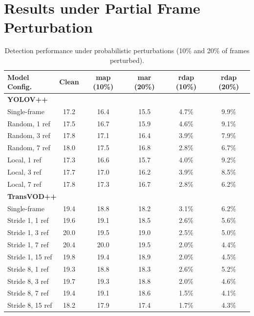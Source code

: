 \documentclass[final,twoside]{vutinfth}
\begin{document}
\section{Results under Partial Frame Perturbation}
\begingroup
\small
\begin{table}[H]
\centering
\caption{Detection performance under probabilistic perturbations (10\% and 20\% of frames perturbed).}

\small
\setlength{\tabcolsep}{3pt}

\begin{tabular}{p{} c c c c c}
\toprule
\rowcolor{tableheader}
\textbf{Model Config.} & \textbf{Clean} & \textbf{\gls{map} (10\%)} & \textbf{\gls{mar} (20\%)} & \textbf{\gls{rdap} (10\%)} & \textbf{\gls{rdap} (20\%)} \\
\midrule
\multicolumn{6}{l}{\textbf{YOLOV++}} \\
Single-frame & 17.2 & 16.4 & 15.5 & 4.7\% & 9.9\% \\
Random, 1 ref & 17.5 & 16.7 & 15.9 & 4.6\% & 9.1\% \\
Random, 3 ref & 17.8 & 17.1 & 16.4 & 3.9\% & 7.9\% \\
Random, 7 ref & 18.0 & 17.5 & 16.8 & 2.8\% & 6.7\% \\
Local, 1 ref & 17.3 & 16.6 & 15.7 & 4.0\% & 9.2\% \\
Local, 3 ref & 17.7 & 17.0 & 16.2 & 3.9\% & 8.5\% \\
Local, 7 ref & 17.8 & 17.3 & 16.7 & 2.8\% & 6.2\% \\
\midrule
\multicolumn{6}{l}{\textbf{TransVOD++}} \\
Single-frame & 19.4 & 18.8 & 18.2 & 3.1\% & 6.2\% \\
Stride 1, 1 ref & 19.6 & 19.1 & 18.5 & 2.6\% & 5.6\% \\
Stride 1, 3 ref & 20.0 & 19.5 & 19.0 & 2.5\% & 5.0\% \\
Stride 1, 7 ref & 20.4 & 20.0 & 19.5 & 2.0\% & 4.4\% \\
Stride 1, 15 ref & 19.8 & 19.4 & 18.9 & 2.0\% & 4.5\% \\
Stride 8, 1 ref & 19.3 & 18.8 & 18.3 & 2.6\% & 5.2\% \\
Stride 8, 3 ref & 19.7 & 19.3 & 18.8 & 2.0\% & 4.6\% \\
Stride 8, 7 ref & 19.4 & 19.1 & 18.6 & 1.5\% & 4.1\% \\
Stride 8, 15 ref & 18.2 & 17.9 & 17.4 & 1.7\% & 4.3\% \\
\bottomrule
\end{tabular}\label{tab:single_frame_perturbations}
\end{table}
\end{document}
